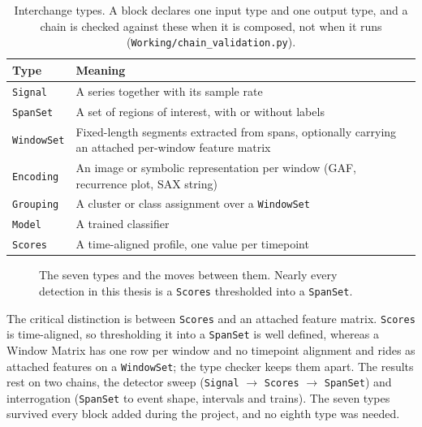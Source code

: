 \begin{table}[htbp]
\caption[Interchange types]{Interchange types. A block declares one input type and one output type, and a chain is checked against these when it is composed, not when it runs (\texttt{Working/chain\_validation.py}).}
\label{tab:types}
\begin{center}
\begin{tabular}{p{2.6cm} p{10.6cm}}
\toprule
\textbf{Type} & \textbf{Meaning}\\
\midrule
\texttt{Signal} & A series together with its sample rate\\
\texttt{SpanSet} & A set of regions of interest, with or without labels\\
\texttt{WindowSet} & Fixed-length segments extracted from spans, optionally carrying an attached per-window feature matrix\\
\texttt{Encoding} & An image or symbolic representation per window (GAF, recurrence plot, SAX string)\\
\texttt{Grouping} & A cluster or class assignment over a \texttt{WindowSet}\\
\texttt{Model} & A trained classifier\\
\texttt{Scores} & A time-aligned profile, one value per timepoint\\
\bottomrule
\end{tabular}
\end{center}
\end{table}

\begin{figure}[htbp]
\centering

\caption[{The seven types and the moves between them.}]{The seven types and the moves between them. Nearly every detection in this thesis is a \texttt{Scores} thresholded into a \texttt{SpanSet}.}
\label{fig:types}
\end{figure}

The critical distinction is between \texttt{Scores} and an attached feature matrix. \texttt{Scores} is time-aligned, so thresholding it into a \texttt{SpanSet} is well defined, whereas a Window Matrix has one row per window and no timepoint alignment and rides as attached features on a \texttt{WindowSet}; the type checker keeps them apart. The results rest on two chains, the detector sweep (\texttt{Signal} $\rightarrow$ \texttt{Scores} $\rightarrow$ \texttt{SpanSet}) and interrogation (\texttt{SpanSet} to event shape, intervals and trains). The seven types survived every block added during the project, and no eighth type was needed.

